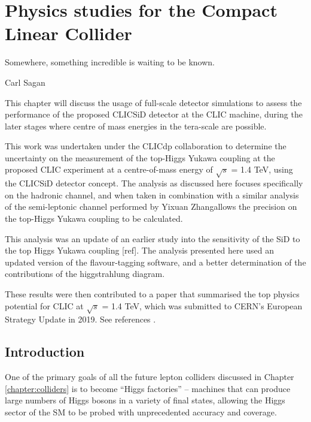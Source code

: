 
\chapter{Physics studies for the Compact Linear Collider}
\label{chapter:analysis}

\epigraph{Somewhere, something incredible is waiting to be known.}{Carl Sagan}

This chapter will discuss the usage of full-scale detector simulations to assess the performance of the proposed \acrshort{CLIC}\textunderscore \acrshort{SiD} detector at the \acrlong{CLIC} machine, during the later stages where centre of mass energies in the tera-scale are possible.

This work was undertaken under the \acrfull{CLICdp} collaboration to determine the uncertainty on the measurement of the top-Higgs Yukawa coupling at the proposed \acrfull{CLIC} experiment at a centre-of-mass energy of $\sqrt{s}$ = 1.4 TeV, using the \acrshort{CLIC}\textunderscore \acrshort{SiD} detector concept. The analysis as discussed here focuses specifically on the hadronic channel, and when taken in combination with a similar analysis of the semi-leptonic channel performed by Yixuan Zhang allows the precision on the top-Higgs Yukawa coupling to be calculated.

This analysis was an update of an earlier study into the sensitivity of the \acrshort{SiD} to the top Higgs Yukawa coupling [ref]. The analysis presented here used an updated version of the flavour-tagging software, and a better determination of the contributions of the higgstrahlung diagram.

These results were then contributed to a paper that summarised the top physics potential for \acrshort{CLIC} at $\sqrt{s}$ = 1.4 TeV, which was submitted to \acrshort{CERN}'s European Strategy Update in 2019. See references \cite{clic-top-quark-physics} \cite{clic-2018-summary}.

\section{Introduction}
One of the primary goals of all the future lepton colliders discussed in Chapter \ref{chapter:colliders} is to become ``Higgs factories'' -- machines that can produce large numbers of Higgs bosons in a variety of final states, allowing the Higgs sector of the \acrlong{SM} to be probed with unprecedented accuracy and coverage.

